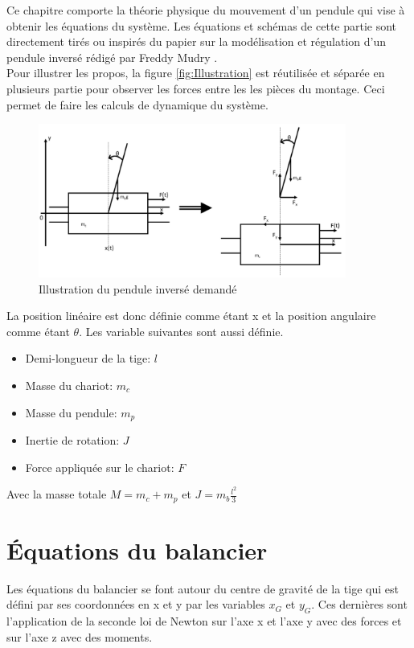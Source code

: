 Ce chapitre comporte la théorie physique du mouvement d'un pendule qui vise à obtenir les équations du système. Les équations et schémas de
cette partie sont directement tirés ou inspirés du papier sur la modélisation et régulation d'un pendule inversé rédigé par Freddy Mudry \cite{FreddyMudry}.\\

Pour illustrer les propos, la figure \ref{fig:Illustration} est réutilisée et séparée en plusieurs partie pour observer les forces entre les
les pièces du montage. Ceci permet de faire les calculs de dynamique du système.

\begin{figure}[H]
    \centering
    \includegraphics[width = 0.9\textwidth]{assets/figures/SchemaPhysiquePendule.svg}
    \caption{Illustration du pendule inversé demandé}
    \label{fig:Illustration2}
\end{figure}

La position linéaire est donc définie comme étant x et la position angulaire comme étant $\theta$. Les variable suivantes sont aussi définie.

\begin{itemize}
    \item Demi-longueur de la tige: $l$
    \item Masse du chariot: $m_c$
    \item Masse du pendule: $m_p$
    \item Inertie de rotation: $J$
    \item Force appliquée sur le chariot: $F$
\end{itemize}

Avec la masse totale $M = m_c + m_p$ et $J = m_b\frac{l^2}{3}$

\section{Équations du balancier}\label{sec:EqBal}
Les équations du balancier se font autour du centre de gravité de la tige qui est défini par ses coordonnées en x et y par les variables $x_G$
et $y_G$. Ces dernières sont l'application de la seconde loi de Newton sur l'axe x et l'axe y avec des forces et sur l'axe z avec des moments.

